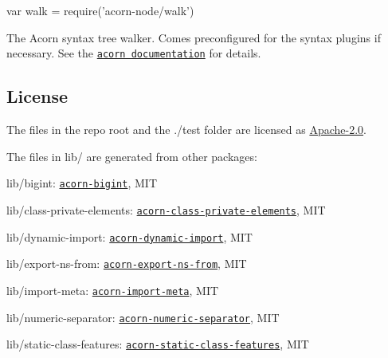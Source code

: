 \begin{DoxyCode}
var walk = require('acorn-node/walk')
\end{DoxyCode}


The Acorn syntax tree walker. Comes preconfigured for the syntax plugins if necessary. See the \href{https://github.com/acornjs/acorn#distwalkjs}{\tt acorn documentation} for details.

\subsection*{License}

The files in the repo root and the ./test folder are licensed as \mbox{\hyperlink{md_LICENSE}{Apache-\/2.0}}.

The files in lib/ are generated from other packages\+:


\begin{DoxyItemize}
\item lib/bigint\+: \href{https://github.com/acornjs/acorn-bigint]}{\tt acorn-\/bigint}, M\+IT
\item lib/class-\/private-\/elements\+: \href{https://github.com/acornjs/acorn-class-private-elements}{\tt acorn-\/class-\/private-\/elements}, M\+IT
\item lib/dynamic-\/import\+: \href{https://github.com/acornjs/acorn-dynamic-import}{\tt acorn-\/dynamic-\/import}, M\+IT
\item lib/export-\/ns-\/from\+: \href{https://github.com/acornjs/acorn-export-ns-from}{\tt acorn-\/export-\/ns-\/from}, M\+IT
\item lib/import-\/meta\+: \href{https://github.com/acornjs/acorn-import-meta}{\tt acorn-\/import-\/meta}, M\+IT
\item lib/numeric-\/separator\+: \href{https://github.com/acornjs/acorn-numeric-separator]}{\tt acorn-\/numeric-\/separator}, M\+IT
\item lib/static-\/class-\/features\+: \href{https://github.com/acornjs/acorn-static-class-features}{\tt acorn-\/static-\/class-\/features}, M\+IT 
\end{DoxyItemize}